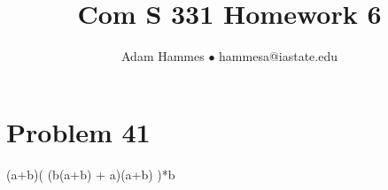 \documentclass[11pt]{article}
\begin{document}
\title{Com S 331 Homework 6}
\author{Adam Hammes $\bullet$ hammesa@iastate.edu}
\maketitle

\section*{Problem 41}

(a+b)( (b(a+b) + a)(a+b) )*b
\end{document}
